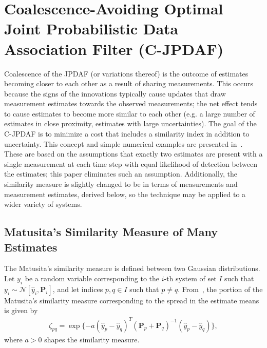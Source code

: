 \documentclass[letterpaper, 10pt, conference]{ieeeconf}
\begin{document}
\section{Coalescence-Avoiding Optimal Joint Probabilistic Data Association Filter (C-JPDAF)}
\label{C-JPDAF}


Coalescence of the JPDAF (or variations thereof) is the outcome of estimates becoming closer to each other as a result of sharing measurements. This occurs because the signs of the innovations typically cause updates that draw measurement estimates towards the observed measurements; the net effect tends to cause estimates to become more similar to each other (e.g. a large number of estimates in close proximity, estimates with large uncertainties).
The goal of the C-JPDAF is to minimize a cost that includes a similarity index in addition to uncertainty.
This concept and simple numerical examples are presented in~\cite{KauLovLee14}.
These are based on the assumptions that exactly two estimates are present with a single measurement at each time step with equal likelihood of detection between the estimates; this paper eliminates such an assumption.
Additionally, the similarity measure is slightly changed to be in terms of measurements and measurement estimates, derived below, so the technique may be applied to a wider variety of systems.

\subsection{Matusita's Similarity Measure of Many Estimates}

The Matusita's similarity measure is defined between two Gaussian distributions.
Let $y_i$ be a random variable corresponding to the $i$-th system of set $I$ such that $y_i \sim \mathcal{N}[\hat y_i,{\mathbf P}_i]$, and let indices $p,q\in I$ such that $p\neq q$.
From~\cite{KauLovLee14}, the portion of the Matusita's similarity measure corresponding to the spread in the estimate means is given by
\begin{align}
\zeta_{pq}=\exp \{-a(\hat y_{p}- \hat y_{q})^T({\mathbf P}_{p}
+{\mathbf P}_{q})^{-1}(\hat y_{p}-\hat y_{q})\},\label{eqn:Mat2Est}
\end{align}
where $a>0$ shapes the similarity measure.
\end{document}
